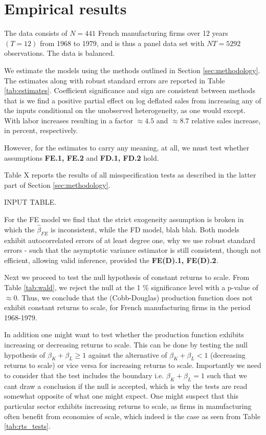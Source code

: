 \section{Empirical results}

The data consists of $N = 441$ French manufacturing firms over 12 years $(T=12)$ from 1968 to 1979, and is thus a panel data set with $NT = 5292$ observations. The data is balanced.  

We estimate the models using the methods outlined in Section \ref{sec:methodology}. The estimates along with robust standard errors are reported in Table \ref{tab:estimates}. Coefficient significance and sign are consistent between methods that is we find a positive partial effect on log deflated sales from increasing any of the inputs conditional on the unobserved heterogeneity, as one would except. With labor increases resulting in a factor $\approx 4.5$ and $\approx 8.7$ relative sales increase, in percent, respectively. 



However, for the estimates to carry any meaning, at all, we must test whether assumptions \textbf{FE.1, FE.2} and \textbf{FD.1, FD.2} hold. 

Table X reports the results of all misspecification tests as described in the latter part of Section \ref{sec:methodology}. 

INPUT TABLE. 

For the FE model we find that the strict exogeneity assumption is broken in which the $\hat{\beta}_{FE}$ is inconsistent, while the FD model, blah blah. Both models exhibit autocorrelated errors of at least degree one, why we use robust standard errors - such that the asymptotic variance estimator is still consistent, though not efficient, allowing valid inference, provided the \textbf{FE(D).1, FE(D).2}.

Next we proceed to test the null hypothesis of constant returns to scale. From Table \ref{tab:wald}, we reject the null at the 1 \% significance level with a p-value of $\approx 0$. Thus, we conclude that the (Cobb-Douglas) production function does not exhibit constant returns to scale, for French manufacturing firms in the period 1968-1979. 



In addition one might want to test whether the production function exhibits increasing or decreasing returns to scale. This can be done by testing the null hypothesis of $\beta_K + \beta_L \geq 1$ against the alternative of $\beta_K + \beta_L < 1$ (decreasing returns to scale) or vice versa for increasing returns to scale. Importantly we need to consider that the test includes the boundary i.e. $\beta_K + \beta_L = 1$ such that we cant draw a conclusion if the null is accepted, which is why the tests are read somewhat opposite of what one might expect. One might suspect that this particular sector exhibits increasing returns to scale, as firms in manufacturing often benefit from economies of scale, which indeed is the case as seen from Table \ref{tab:rts_tests}.


